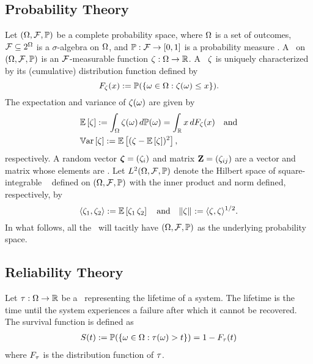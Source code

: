 \subsection{Probability Theory}
Let $(\Omega, \mathcal{F}, \mathbb{P})$ be a complete probability space, where $\Omega$ is a set of outcomes, $\mathcal{F} \subseteq 2^\Omega$ is a $\sigma$-algebra on $\Omega$, and $\mathbb{P}: \mathcal{F} \to [0, 1]$ is a probability measure \cite{durrett2010}.
A \rv\ on $(\Omega, \mathcal{F}, \mathbb{P})$ is an $\mathcal{F}$-measurable function $\zeta: \Omega \to \mathbb{R}$.
A \rv\ $\zeta$ is uniquely characterized by its (cumulative) distribution function defined by
\begin{equation*}
  F_\zeta(x) := \mathbb{P}(\{ \omega \in \Omega: \zeta(\omega) \leq x \}).
\end{equation*}
The expectation and variance of $\zeta(\omega)$ are given by
\begin{align*}
  & \mathbb{E}\left[ \zeta \right] := \int_\Omega \zeta(\omega) \, d\mathbb{P}(\omega) = \int_{\mathbb{R}} x \, d F_\zeta(x) \hspace{1em} \text{and} \\
  & \mathbb{V}\text{ar}\left[ \zeta \right] := \mathbb{E}\left[ (\zeta - \mathbb{E}\left[ \zeta \right])^2 \right],
\end{align*}
respectively.
A random vector $\bm{\zeta} = (\zeta_i)$ and matrix $\mathbf{Z} = (\zeta_{ij})$ are a vector and matrix whose elements are \rvs.
Let $L^{2}(\Omega, \mathcal{F}, \mathbb{P})$ denote the Hilbert space of square-integrable \rvs\ \cite{janson1997} defined on $(\Omega, \mathcal{F}, \mathbb{P})$ with the inner product and norm defined, respectively, by
\begin{equation*}
  \langle \zeta_1, \zeta_2 \rangle := \mathbb{E}\left[ \zeta_1 \, \zeta_2 \right] \hspace{1em} \text{and} \hspace{1em} \| \zeta \|_{} := \langle \zeta, \zeta \rangle^{1/2}.
\end{equation*}
In what follows, all the \rvs\ will tacitly have $(\Omega, \mathcal{F}, \mathbb{P})$ as the underlying probability space.

\subsection{Reliability Theory}
Let $\tau: \Omega \to \mathbb{R}$ be a \rv\ representing the lifetime of a system.
The lifetime is the time until the system experiences a failure after which it cannot be recovered.
The survival function is defined as
\begin{align*}
  S(t) := \mathbb{P}(\{ \omega \in \Omega: \tau(\omega) > t \}) = 1 - F_\tau(t)
\end{align*}
where $F_\tau$ is the distribution function of $\tau$.
